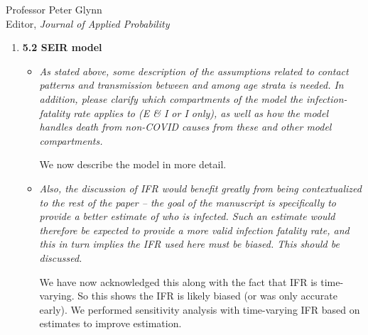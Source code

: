 \documentclass[11pt]{letter} %
\begin{document}
\begin{letter}{Professor
	Peter Glynn\\
	Editor, {\em Journal of Applied Probability}}
\begin{enumerate}
\begin{itemize}
	We have added Remark XX to discuss the bias.  In Remark XX, we state that availability of symptom status (which we know the state collects but has told us is unavailable due to data privacy / confidentiality issues) is important to use.
	\vspace{5mm}
	\item {\it Also, focusing on the non-Hispanic, white male groups seems potentially to limit understanding of the scope of error. Although Indiana has a very high percent of white individuals, the individuals who present for testing (as well as those who test positive, are exposed in the workplace and home, and hospitalized or die) are disproportionately non-white. It is important to show the performance of the method in both white and non-white individuals because non-white individuals are the ones who are experiencing higher rates of illness and death and therefore will likely be more negatively impacted by biased estimates of disease prevalence.}
	\vspace{5mm}

	We acknowledge this shortcoming.  We now include versions of Figure 6 for non-white fr
	\vspace{5mm}
\end{itemize}
\item {\bf 5.2 SEIR model}
\begin{itemize}
	\item {\it As stated above, some description of the assumptions related to contact patterns and transmission between and among age strata is needed. In addition, please clarify which compartments of the model the infection-fatality rate applies to (E \& I or I only), as well as how the model handles death from non-COVID causes from these and other model compartments.}
	\vspace{5mm}

	We now describe the model in more detail.
	\vspace{5mm}
	\item {\it Also, the discussion of IFR would benefit greatly from being contextualized to the rest of the paper – the goal of the manuscript is specifically to provide a better estimate of who is infected. Such an estimate would therefore be expected to provide a more valid infection fatality rate, and this in turn implies the IFR used here must be biased. This should be discussed.}
	\vspace{5mm}

    We have now acknowledged this along with the fact that IFR is time-varying. So this shows the IFR is likely biased (or was only accurate early).  We performed sensitivity analysis with time-varying IFR based on estimates to improve estimation.
	\vspace{5mm}
\end{itemize}
\end{enumerate}
\newpage


\end{letter}
\end{document}
